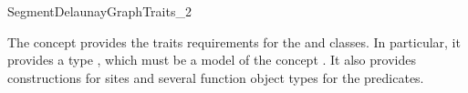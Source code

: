 



\begin{ccRefConcept}{SegmentDelaunayGraphTraits_2}

\ccDefinition

The concept  provides the traits
requirements for the  and
 classes. In
particular, it provides a type , which must be a model of
the concept . It also provides
constructions for sites and several function object
types for the predicates.

\ccRefines
{}\\
\\


\end{ccRefConcept}
